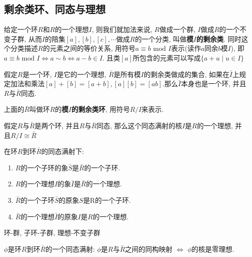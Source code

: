\subsection{剩余类环、同态与理想} %

\begin{Note}
给定一个环$R$和$R$的一个理想$I$, 则我们就加法来说, $R$做成一个群, $I$做成$R$的一个不变子群, 从而$I$的陪集$[a], [b], [c], \cdots$做成$R$的一个分类, 叫做\textbf{模$I$的剩余类}. 同时这个分类描述$R$的元素之间的等价关系, 用符号$a \equiv b \text{ mod } I$表示(读作$a$同余$b$模$I$), 即$a \equiv b \text{ mod } I \Leftrightarrow a \sim b \Leftrightarrow a - b \in I$. 且类$[a]$所包含的元素可以写成$\{ a + u \mid u \in I \}$
\end{Note}

\begin{Theorem}
假定$R$是一个环, $I$是它的一个理想, $\bar{R}$是所有模$I$的剩余类做成的集合, 如果在$\bar{I}$上规定加法和乘法$[a] + [b] = [a + b], [a][b] = [ab]$.那么$\bar{I}$本身也是一个环, 并且$R$与$\bar{R}$同态.
\end{Theorem}

\begin{Definition}[模$I$的剩余类环]
上面的$\bar{R}$叫做环$R$的\textbf{模$I$的剩余类环}, 用符号$R/I$来表示.
\end{Definition}

\begin{Theorem}[!]
假定$R$与$\bar{R}$是两个环, 并且$R$与$\bar{R}$同态, 那么这个同态满射的核$I$是$R$的一个理想, 并且$R/I \cong \bar{R}$
\end{Theorem}

\begin{Theorem}
在环$R$到环$\bar{R}$的同态满射下:
\begin{enumerate}[(1)]
	\item $R$的一个子环的象$\bar{S}$是$\bar{R}$的一个子环.
	\item $R$的一个理想$I$的象$\bar{I}$是$\bar{R}$的一个理想.
	\item $\bar{R}$的一个子环$\bar{S}$的原象$S$是R的一个子环.
	\item $\bar{R}$的一个理想$\bar{I}$的原象$I$是$R$的一个理想.
\end{enumerate}

\end{Theorem}

\begin{Note}
	环-群, 子环-子群, 理想-不变子群
\end{Note}

\begin{Proposition}
$\phi$是环$R$到环$\bar{R}$的一个同态满射: $\phi$是$R$与$\bar{R}$之间的同构映射 $\Leftrightarrow$ $\phi$的核是零理想.
\end{Proposition}

